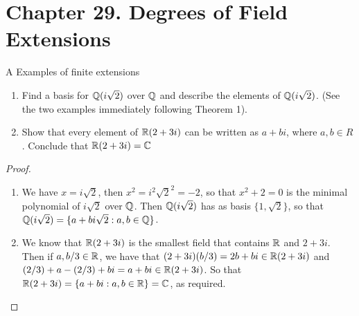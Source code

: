 \section*{Chapter 29. Degrees of Field Extensions}


\begin{exercise}{A Examples of finite extensions}
\begin{enumerate}
    \item Find a basis for $\mathbb{Q}(i\sqrt{2})$ over $\mathbb{Q}$ and describe the elements of $\mathbb{Q}(i\sqrt{2})$. (See the two examples immediately following Theorem 1).
    \item Show that every element of $\mathbb{R}(2+3i)$ can be written as $a+bi$, where $a,b\in R$. Conclude that $\mathbb{R}(2+3i)=\mathbb{C}$
\end{enumerate}
\end{exercise}
\begin{proof}
 \begin{enumerate}
     \item We have $x=i\sqrt{2}$, then $x^2=i^2\sqrt{2}^2=-2$, so that $x^2+2=0$ is the minimal polynomial of $i\sqrt{2}$ over $\mathbb{Q}$. Then $\mathbb{Q}(i\sqrt{2})$ has as basis $\{1,\sqrt{2}\}$, so that $\mathbb{Q}(i\sqrt{2})=\{a+bi\sqrt{2}: a,b\in\mathbb{Q}\}$.
     \item We know that $\mathbb{R}(2+3i)$ is the smallest field that contains $\mathbb{R}$ and $2+3i$. Then if $a,b/3\in\mathbb{R}$, we have that $(2+3i)(b/3)= 2b+bi\in\mathbb{R}(2+3i)$ and $(2/3)+a-(2/3)+bi=a+bi\in\mathbb{R}(2+3i)$. So that $\mathbb{R}(2+3i)=\{a+bi: a,b\in\mathbb{R}\}= \mathbb{C}$, as required.
 \end{enumerate}
\end{proof}

